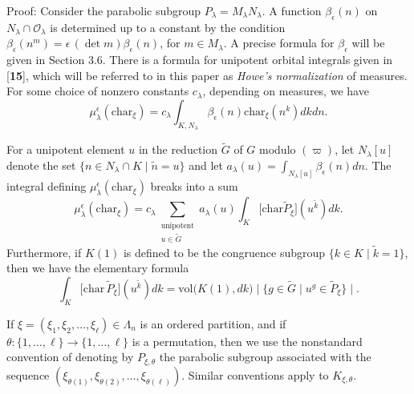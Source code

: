 \documentclass{amsart}
\begin{document}
\pproclaim Proof:
Consider the parabolic subgroup
  $P_{\lambda} = M_{\lambda} N_{\lambda} $.
A function 
  $ \beta_{\epsilon} (n) $ on
  $ N_{\lambda} \cap {\mathcal O}  _{\lambda} $ is
determined up to a constant by the condition
  $ \beta_{\epsilon} (n^m) =
    \epsilon \, (\det m) 
    \beta_{\epsilon} (n)$, for
  $ m \in M_{\lambda} $.
A precise formula for 
  $ \beta_{\epsilon} $
will be given in Section 3.6.
There is a formula for unipotent orbital integrals
given in [{\bf 15}], which will be referred to
in this paper as {\it Howe's normalization} of measures.
For some choice of nonzero constants 
  $ c_{\lambda} $,
depending on measures, we have
%
$$
  \mu_{\lambda}^{\epsilon}
  (\text{char}_{\xi}) =
  c_{\lambda}
  \int_{K,N_{\lambda}} 
  \beta_{\epsilon} (n) 
  \text{char}_{\xi} (n^k) dkdn.
$$

For a unipotent element $u$ in the reduction $\tilde G$ of $G$ modulo $(\varpi)$,
let
  $ N_{\lambda} [u]$ denote the set  
    $\{ n \in N_{\lambda} \cap K \mid \tilde n = u \} $
and let 
  $ a_{\lambda} (u) = \int_{N_{\lambda}[u]}
    \beta_{\epsilon} (n) dn $.
The integral defining $\mu^\epsilon_\lambda(\text{char}_\xi)$ breaks
into a sum
%
$$
  \mu_{\lambda}^{\epsilon} (\text{char}_{\xi}) =
  c_{\lambda}
  \sum_{\substack{
     \text{unipotent} \\
     u \in \tilde G}}
  a_{\lambda} (u)
  \int_K
  \bigl[
     \text{char}
     \tilde P_{\xi}
  \bigr]
  (u^{\tilde k}) dk.
$$
%
Furthermore, if $K(1)$ is defined to be the congruence subgroup
$\{k\in K\mid \tilde k=1\}$, then we have the elementary formula
%
$$
  \int_K
  \bigl[
    \text{char}\,\tilde P_\xi
  \bigr]
  ( u^{\tilde k})
  dk =
  \text{vol}
  \bigl(
    K(1), dk
  \bigr)
 \mid 
  \{
    g \in \tilde G \mid u^g \in \tilde P_{\xi}
  \}\mid.
$$

If
  $ \xi = (\xi_1, \xi_2, \dots ,\xi_{\ell} ) \in\Lambda_n$ is an
  ordered partition,
and if
  $ \theta: \{ 1, \dots , \ell \} \to
    \{ 1, \dots , \ell \} $
is a permutation, then we use the nonstandard convention of denoting by
  $ P_{\xi, \theta} $
the parabolic subgroup associated with the sequence
  $ (\xi_{\theta(1)},
     \xi_{\theta(2)}, \dots ,
     \xi_{\theta(\ell)} ) $.
Similar conventions apply to 
  $ K_{\xi,\theta} $.
\end{document}
